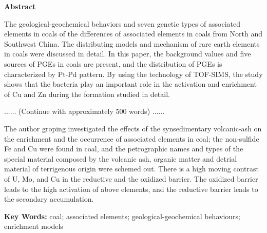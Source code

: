 \clearpage
{}
{}

\begin{center}
    \bfseries\selectfont
    \vspace*{12pt}
    Abstract
    \vspace*{6pt}
\end{center}

\begingroup
    \selectfont
    \setlength{\parindent}{2em}
    \setlength{\parskip}{0pt}
    
    The geological-geochemical behaviors and seven genetic types of associated elements in coals of the differences of associated elements in coals from North and Southwest China. The distributing models and mechanism of rare earth elements in coals were discussed in detail. In this paper, the background values and five sources of PGEs in coals are present, and the distribution of PGEs is characterized by Pt-Pd pattern. By using the technology of TOF-SIMS, the study shows that the bacteria play an important role in the activation and enrichment of Cu and Zn during the formation studied in detail.
    \par
    \vspace{\baselineskip}
    \centerline{...... (Continue with approximately 500 words) ......}
    \par
    \vspace{\baselineskip}
    The author groping investigated the effects of the synsedimentary volcanic-ash on the enrichment and the occurrence of associated elements in coal; the non-sulfide Fe and Cu were found in coal, and the petrographic names and types of the special material composed by the volcanic ash, organic matter and detrial material of terrigenous origin were schemed out. There is a high moving contrast of U, Mo, and Cu in the reductive and the oxidized barrier. The oxidized barrier leads to the high activation of above elements, and the reductive barrier leads to the secondary accumulation.
    \par
\endgroup

\begingroup
    \textbf{Key Words: } coal; associated elements; geological-geochemical behaviours; enrichment models
\endgroup
\clearpage
